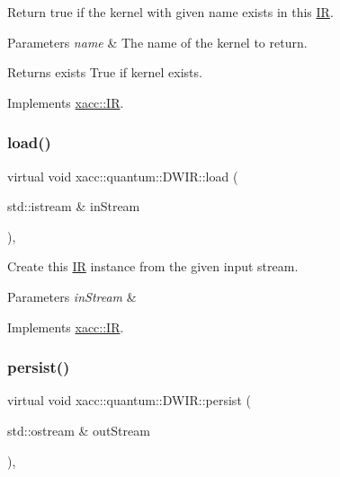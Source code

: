 Return true if the kernel with given name exists in this \hyperlink{a01677}{IR}.


\begin{DoxyParams}{Parameters}
{\em name} & The name of the kernel to return. \\
\hline
\end{DoxyParams}
\begin{DoxyReturn}{Returns}
exists True if kernel exists. 
\end{DoxyReturn}


Implements \hyperlink{a01677_afc9ccf5126f3fed19c2e879133b2f6d8}{xacc\+::\+IR}.

\mbox{\label{a01217_a8b388d719d565bb902c979807d3d0d47}} 
\subsubsection{\texorpdfstring{load()}{load()}}
{\footnotesize\ttfamily virtual void xacc\+::quantum\+::\+D\+W\+I\+R\+::load (\begin{DoxyParamCaption}\item[{std\+::istream \&}]{in\+Stream }\end{DoxyParamCaption})\hspace{0.3cm}{\ttfamily [inline]}, {\ttfamily [virtual]}}

Create this \hyperlink{a01677}{IR} instance from the given input stream.


\begin{DoxyParams}{Parameters}
{\em in\+Stream} & \\
\hline
\end{DoxyParams}


Implements \hyperlink{a01677_a444c2e4dc0faac500fb70fa93997e9bc}{xacc\+::\+IR}.

\mbox{\label{a01217_abcbfd0a4cf697843391c65cbd9a82080}} 
\subsubsection{\texorpdfstring{persist()}{persist()}}
{\footnotesize\ttfamily virtual void xacc\+::quantum\+::\+D\+W\+I\+R\+::persist (\begin{DoxyParamCaption}\item[{std\+::ostream \&}]{out\+Stream }\end{DoxyParamCaption})\hspace{0.3cm}{\ttfamily [inline]}, {\ttfamily [virtual]}}

